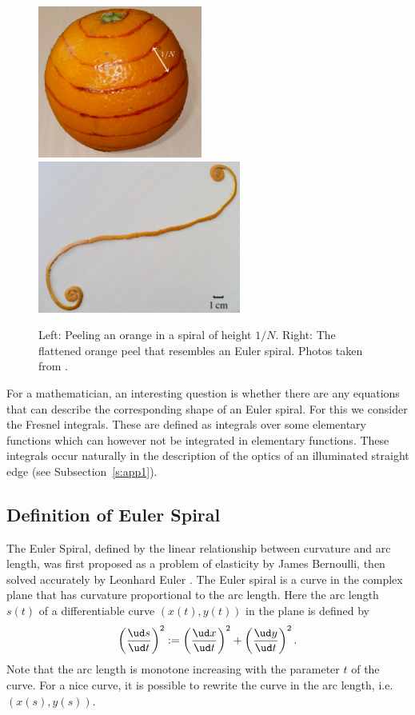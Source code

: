 \documentclass[12pt]{article}
\newcommand\udfrac[2]{\ensuremath{\frac{\ud#1}{\ud #2}}}
\begin{document}
\begin{figure}[h!]
	\centering
	\includegraphics[height=5cm]{orange.jpg} \hfill
	\includegraphics[height=5cm]{orangePeel.jpg}
	\label{f:orangePeel}
	\caption{Left: Peeling an orange in a spiral of height $1/N$.
		Right: The flattened orange peel that resembles an Euler spiral.  Photos taken from \cite{BH12}.
	}
\end{figure}

For a mathematician, an interesting question is whether there are any equations that can describe the corresponding shape of an Euler spiral. For this we consider the Fresnel integrals.  These are defined as integrals over some elementary functions which can however not be integrated in elementary functions.  These integrals occur naturally in the description of the optics of an illuminated straight edge (see Subsection~\ref{s:app1}).


\subsection{Definition of Euler Spiral}
The Euler Spiral, defined by the  linear relationship between curvature and arc length, was
first proposed as a problem of elasticity by James Bernoulli, then solved accurately by Leonhard Euler \cite{Lev08}.
The Euler spiral is a curve in the complex plane that has curvature proportional to the arc length.  Here the arc length $s(t)$ of a differentiable curve $(x(t),y(t))$ in the plane is defined by
\[  \left(\udfrac{s}{t}\right)^2 := \left(\udfrac{x}{t}\right)^2 +\left(\udfrac{y}{t}\right)^2.
\]  Note that the arc length is monotone increasing with the parameter $t$ of the curve.  For a nice curve, it is possible to rewrite the curve in the arc length, i.e.~$(x(s),y(s))$.
\end{document}
